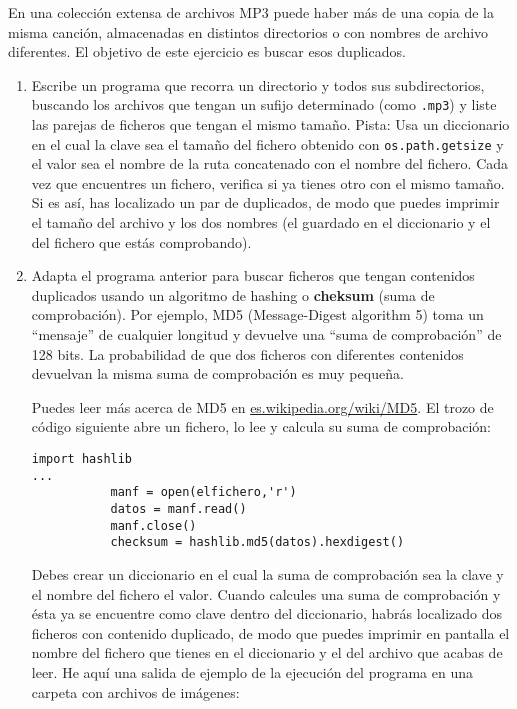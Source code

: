 \begin{ex}
\label{checksum}


En una colección extensa de archivos MP3 puede haber más de una
copia de la misma canción, almacenadas en distintos directorios o con
nombres de archivo diferentes. El objetivo de este ejercicio es buscar
esos duplicados.

\begin{enumerate}

\item Escribe un programa que recorra un directorio y todos sus
subdirectorios, buscando los archivos que tengan un sufijo determinado (como {\tt .mp3})
y liste las parejas de ficheros que tengan el mismo tamaño.
Pista: Usa un diccionario en el cual la clave sea el tamaño
del fichero obtenido con {\tt os.path.getsize} y el valor sea
el nombre de la ruta concatenado con el nombre del fichero.
Cada vez que encuentres un fichero, verifica si ya tienes otro
con el mismo tamaño. Si es así, has localizado un par de duplicados,
de modo que puedes imprimir el tamaño del archivo y los dos nombres
(el guardado en el diccionario y el del fichero que estás comprobando).


\item Adapta el programa anterior para buscar ficheros que
tengan contenidos duplicados usando un algoritmo de hashing o
{\bf cheksum} (suma de comprobación). Por ejemplo,
MD5 (Message-Digest algorithm 5) toma un ``mensaje'' de cualquier
longitud y devuelve una ``suma de comprobación'' de 128 bits. La probabilidad
de que dos ficheros con diferentes contenidos devuelvan la misma
suma de comprobación es muy pequeña.

Puedes leer más acerca de MD5 en \url{es.wikipedia.org/wiki/MD5}. El trozo
de código siguiente abre un fichero, lo lee y calcula
su suma de comprobación:

\beforeverb
\begin{verbatim}
import hashlib 
...
           manf = open(elfichero,'r')
           datos = manf.read()
           manf.close()
           checksum = hashlib.md5(datos).hexdigest()
\end{verbatim}
\afterverb
%
Debes crear un diccionario en el cual la suma de comprobación sea la clave
y el nombre del fichero el valor. Cuando calcules una suma de comprobación
y ésta ya se encuentre como clave dentro del diccionario, habrás localizado
dos ficheros con contenido duplicado, de modo que puedes imprimir en pantalla el nombre del
fichero que tienes en el diccionario y el del archivo que acabas de leer. He aquí una salida
de ejemplo de la ejecución del programa en una carpeta con archivos de imágenes:


\end{enumerate}
\end{ex}
